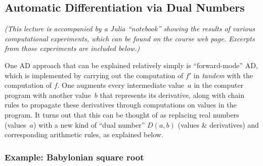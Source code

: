 \subsection{Automatic Differentiation via Dual Numbers}
\label{sec:dual-AD}

\emph{(This lecture is accompanied by a Julia ``notebook'' showing the results of various computational experiments, which can be found on the course web page.  Excerpts from those experiments are included below.)}

One AD approach that can be explained relatively simply is ``forward-mode'' AD, which is implemented by carrying out the computation of $f'$ in \emph{tandem} with the computation of $f$.  One augments every intermediate value~$a$ in the computer program with another value~$b$ that represents its derivative, along with chain rules to propagate these derivatives through computations on values in the program. 
It turns out that this can be thought of as replacing real numbers (values~$a$) with a new kind of ``dual number'' $D(a,b)$ (values \& derivatives) and corresponding arithmetic rules, as explained below.

\subsubsection{Example: Babylonian square root}  
\label{sec:babylonian}

